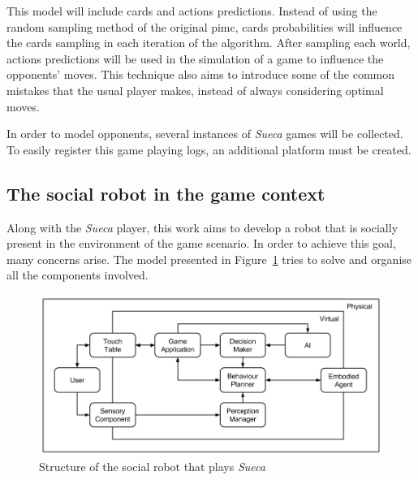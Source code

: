 This model will include cards and actions predictions.
Instead of using the random sampling method of the original \gls{pimc}, cards probabilities will influence the cards sampling in each iteration of the algorithm.
After sampling each world, actions predictions will be used in the simulation of a game to influence the opponents' moves.
This technique also aims to introduce some of the common mistakes that the usual player makes, instead of always considering optimal moves.


In order to model opponents, several instances of \emph{Sueca} games will be collected.
To easily register this game playing logs, an additional platform must be created.




\subsection{The social robot in the game context}
\label{sec:social_solution}

Along with the \emph{Sueca} player, this work aims to develop a robot that is socially present in the environment of the game scenario.
In order to achieve this goal, many concerns arise.
T\textit{}he model presented in Figure~\ref{fig:model} tries to solve and organise all the components involved.

\begin{figure}[ht]
  \centering
    \includegraphics[width=1\textwidth]{./img/model}
  \caption{Structure of the social robot that plays \emph{Sueca}}
\label{fig:model}
\end{figure}

